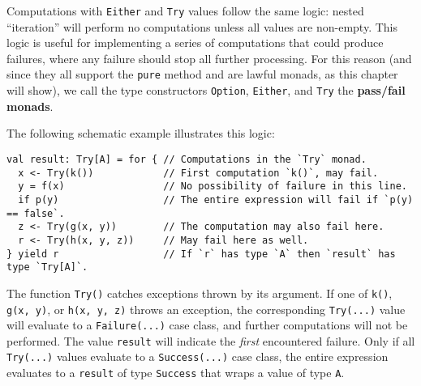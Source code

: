 Computations with \lstinline!Either! and \lstinline!Try! values
follow the same logic: nested \textsf{``}iteration\textsf{''} will perform no computations
unless all values are non-empty. This logic is useful for implementing
a series of computations that could produce failures, where any failure
should stop all further processing. For this reason (and since they
all support the \lstinline!pure! method and are lawful monads, as
this chapter will show), we call the type constructors \lstinline!Option!,
\lstinline!Either!, and \lstinline!Try! the \textbf{pass/fail monads}. 

The following schematic example illustrates this logic:
\begin{lstlisting}
val result: Try[A] = for { // Computations in the `Try` monad.
  x <- Try(k())            // First computation `k()`, may fail.
  y = f(x)                 // No possibility of failure in this line.
  if p(y)                  // The entire expression will fail if `p(y) == false`.
  z <- Try(g(x, y))        // The computation may also fail here.
  r <- Try(h(x, y, z))     // May fail here as well.
} yield r                  // If `r` has type `A` then `result` has type `Try[A]`.
\end{lstlisting}
The function \lstinline!Try()! catches exceptions thrown by its argument.
If one of \lstinline!k()!, \lstinline!g(x, y)!, or \lstinline!h(x, y, z)!
throws an exception, the corresponding \lstinline!Try(...)! value
will evaluate to a \lstinline!Failure(...)! case class, and further
computations will not be performed. The value \lstinline!result!
will indicate the \emph{first} encountered failure. Only if all \lstinline!Try(...)!
values evaluate to a \lstinline!Success(...)! case class, the entire
expression evaluates to a \lstinline!result! of type \lstinline!Success!
that wraps a value of type \lstinline!A!.

